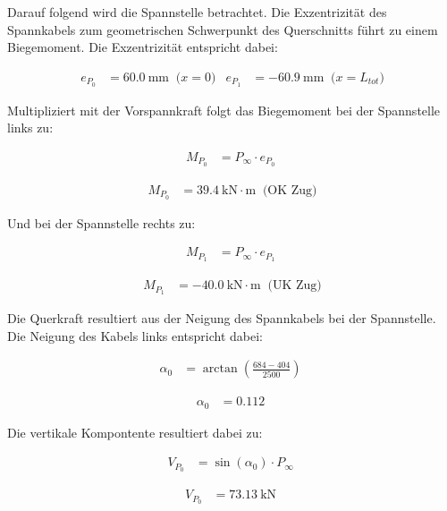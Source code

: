 \documentclass[
  11pt,
  letterpaper,
]{scrreprt}
\begin{document}
Darauf folgend wird die Spannstelle betrachtet. Die Exzentrizität des
Spannkabels zum geometrischen Schwerpunkt des Querschnitts führt zu
einem Biegemoment. Die Exzentrizität entspricht dabei:

$$
\begin{aligned}
e_{P_{0}} &= 60.0\ \mathrm{mm} \; \;\textrm{($x=0$)}
 &e_{P_{1}} &= -60.9\ \mathrm{mm} \; \;\textrm{($x=L_{tot}$)}
\end{aligned}
$$

Multipliziert mit der Vorspannkraft folgt das Biegemoment bei der
Spannstelle links zu:

$$
\begin{aligned}
M_{P_{0}} &= P_{\infty} \cdot e_{P_{0}} \; 
\end{aligned}
$$

$$
\begin{aligned}
M_{P_{0}} &= 39.4\ \mathrm{kN} \cdot \mathrm{m} \; \;\textrm{(OK Zug)}
\end{aligned}
$$

Und bei der Spannstelle rechts zu:

$$
\begin{aligned}
M_{P_{1}} &= P_{\infty} \cdot e_{P_{1}} \; 
\end{aligned}
$$

$$
\begin{aligned}
M_{P_{1}} &= -40.0\ \mathrm{kN} \cdot \mathrm{m} \; \;\textrm{(UK Zug)}
\end{aligned}
$$

Die Querkraft resultiert aus der Neigung des Spannkabels bei der
Spannstelle. Die Neigung des Kabels links entspricht dabei:

$$
\begin{aligned}
\alpha_{0} &= \operatorname{arctan} { \left( \frac{ 684 - 404 }{ 2500 } \right) } \; 
\end{aligned}
$$

$$
\begin{aligned}
\alpha_{0} &= 0.112 \;
\end{aligned}
$$

Die vertikale Kompontente resultiert dabei zu:

$$
\begin{aligned}
V_{P_{0}} &= \sin \left( \alpha_{0} \right) \cdot P_{\infty} \; 
\end{aligned}
$$

$$
\begin{aligned}
V_{P_{0}} &= 73.13\ \mathrm{kN} \;
\end{aligned}
$$
\end{document}

